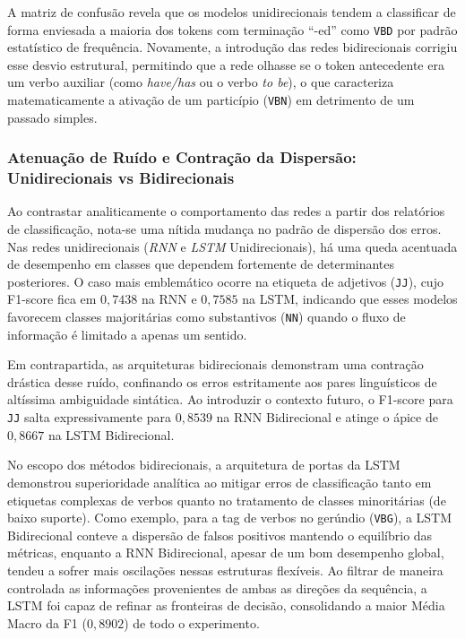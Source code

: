 \documentclass[a4paper,12pt]{article}
\begin{document}
A matriz de confusão revela que os modelos unidirecionais tendem a classificar de forma enviesada a maioria dos tokens com terminação ``-ed'' como \texttt{VBD} por padrão estatístico de frequência. Novamente, a introdução das redes bidirecionais corrigiu esse desvio estrutural, permitindo que a rede olhasse se o token antecedente era um verbo auxiliar (como \textit{have/has} ou o verbo \textit{to be}), o que caracteriza matematicamente a ativação de um particípio (\texttt{VBN}) em detrimento de um passado simples.

\subsubsection*{Atenuação de Ruído e Contração da Dispersão: Unidirecionais vs Bidirecionais}

Ao contrastar analiticamente o comportamento das redes a partir dos relatórios de classificação, nota-se uma nítida mudança no padrão de dispersão dos erros. Nas redes unidirecionais (\textit{RNN} e \textit{LSTM} Unidirecionais), há uma queda acentuada de desempenho em classes que dependem fortemente de determinantes posteriores. O caso mais emblemático ocorre na etiqueta de adjetivos (\texttt{JJ}), cujo F1-score fica em $0,7438$ na RNN e $0,7585$ na LSTM, indicando que esses modelos favorecem classes majoritárias como substantivos (\texttt{NN}) quando o fluxo de informação é limitado a apenas um sentido.

Em contrapartida, as arquiteturas bidirecionais demonstram uma contração drástica desse ruído, confinando os erros estritamente aos pares linguísticos de altíssima ambiguidade sintática. Ao introduzir o contexto futuro, o F1-score para \texttt{JJ} salta expressivamente para $0,8539$ na RNN Bidirecional e atinge o ápice de $0,8667$ na LSTM Bidirecional.

No escopo dos métodos bidirecionais, a arquitetura de portas da LSTM demonstrou superioridade analítica ao mitigar erros de classificação tanto em etiquetas complexas de verbos quanto no tratamento de classes minoritárias (de baixo suporte). Como exemplo, para a tag de verbos no gerúndio (\texttt{VBG}), a LSTM Bidirecional conteve a dispersão de falsos positivos mantendo o equilíbrio das métricas, enquanto a RNN Bidirecional, apesar de um bom desempenho global, tendeu a sofrer mais oscilações nessas estruturas flexíveis. Ao filtrar de maneira controlada as informações provenientes de ambas as direções da sequência, a LSTM foi capaz de refinar as fronteiras de decisão, consolidando a maior Média Macro da F1 ($0,8902$) de todo o experimento.
\end{document}
